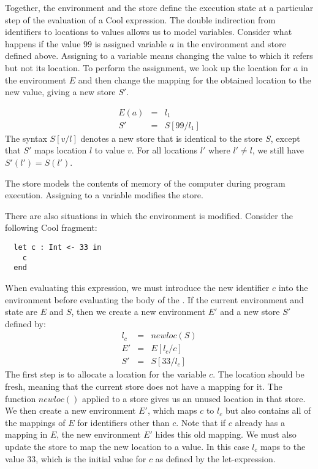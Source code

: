 Together, the environment and the store define the execution state at
a particular step of the evaluation of a Cool expression. The double
indirection from identifiers to locations to values allows us to model
variables. Consider what happens if the value $99$ is assigned
variable $a$ in the environment and store defined above. Assigning to a
variable means changing the value to which it refers but not its
location. To perform the assignment, we look up the location for
$a$ in the environment $E$ and then change the mapping for the
obtained location to the new value, giving a new store $S'$.

\[
\begin{array}{rcl}
	E(a) & = & l_1 \\
	S'   & = & S[99/l_1]
\end{array}
\]
The syntax $S[v/l]$ denotes a new store that is identical to
the store $S$, except that $S'$ maps location $l$ to value
$v$. For all locations $l'$ where $l'\not=l$, we still have
$S'(l')=S(l')$.


The store models the contents of memory of the computer during program execution.
Assigning to a variable modifies the store.

There are also situations in which the environment is modified.
Consider the following Cool fragment:

\begin{center}
\begin{verbatim}
  let c : Int <- 33 in
    c
  end
\end{verbatim}
\end{center}

When evaluating this expression, we must introduce the new
identifier $c$ into the environment before evaluating the body of
the . If the current environment and state are $E$ and
$S$, then we create a new environment $E'$ and a new store $S'$
defined by:
\[
\begin{array}{rcl}
	l_c & = & newloc(S)\\
	E' & = & E[l_c/c]\\
	S' & = & S[33/l_c]
\end{array}
\]
The first step is to allocate a location for the variable $c$.  The
location should be fresh, meaning that the current store does not have
a mapping for it. The function $newloc()$ applied to a store gives us
an unused location in that store. We then create a new environment
$E'$, which maps $c$ to $l_c$ but also contains all of the mappings of
$E$ for identifiers other than $c$. Note that if $c$ already has a
mapping in $E$, the new environment $E'$ hides this old mapping.  We
must also update the store to map the new location to a value. In this
case $l_c$ maps to the value $33$, which is the initial value for $c$
as defined by the let-expression.  

